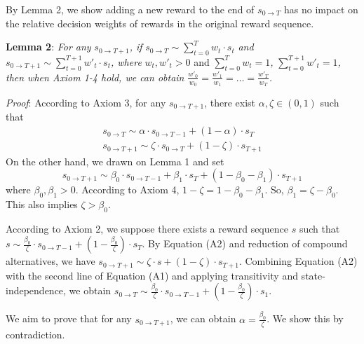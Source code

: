 \documentclass[
  12pt,
]{article}
\begin{document}
By Lemma 2, we show adding a new reward to the end of
\(s_{0\rightarrow T}\) has no impact on the relative decision weights of
rewards in the original reward sequence.

\noindent \textbf{Lemma 2}: \emph{For any}
\(s_{0\rightarrow T+1}\)\emph{, if}
\(s_{0\rightarrow T}\sim \sum_{t=0}^T w_t \cdot s_t\) \emph{and}
\(s_{0\rightarrow T+1} \sim \sum_{t=0}^{T+1} w'_t\cdot s_t\)\emph{,
where} \(w_t, w'_t>0\) and \(\sum_{t=0}^Tw_t=1\)\emph{,}
\(\sum_{t=0}^{T+1}w'_t=1\)\emph{, then when Axiom 1-4 hold, we can
obtain} \(\frac{w'_0}{w_0}=\frac{w'_1}{w_1}=…=\frac{w'_T}{w_T}\)\emph{.}

\noindent \emph{Proof}: According to Axiom 3, for any
\(s_{0\rightarrow T+1}\), there exist \(\alpha,\zeta \in (0,1)\) such
that\[\tag{A1}
\begin{aligned}
s_{0 \rightarrow T}\sim\alpha\cdot s_{0 \rightarrow T-1} + (1-\alpha)\cdot s_T \\
s_{0\rightarrow T+1} \sim \zeta\cdot s_{0\rightarrow T} + (1-\zeta)\cdot s_{T+1}
\end{aligned}
\]On the other hand, we drawn on Lemma 1 and set\[\tag{A2}
s_{0\rightarrow T+1} \sim \beta_0\cdot s_{0 \rightarrow T-1} + \beta_1\cdot s_T + (1-\beta_0-\beta_1)\cdot s_{T+1}
\]where \(\beta_0, \beta_1 > 0\). According to Axiom 4,
\(1-\zeta=1-\beta_0-\beta_1\). So, \(\beta_1=\zeta-\beta_0\). This also
implies \(\zeta > \beta_0\).

According to Axiom 2, we suppose there exists a reward sequence \(s\)
such that
\(s \sim \frac{\beta_0}{\zeta}\cdot s_{0 \rightarrow T-1} + (1-\frac{\beta_0}{\zeta})\cdot s_T\).
By Equation (A2) and reduction of compound alternatives, we have
\(s_{0\rightarrow T+1}\sim \zeta \cdot s + (1-\zeta)\cdot s_{T+1}\).
Combining Equation (A2) with the second line of Equation (A1) and
applying transitivity and state-independence, we obtain
\(s_{0\rightarrow T} \sim \frac{\beta_0}{\zeta}\cdot s_{0 \rightarrow T-1} + (1-\frac{\beta_0}{\zeta})\cdot s_1\).

We aim to prove that for any \(s_{0\rightarrow T+1}\), we can obtain
\(\alpha=\frac{\beta_0}{\zeta}\). We show this by contradiction.
\end{document}
